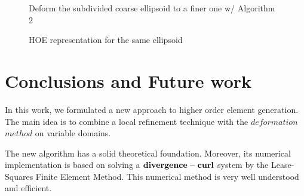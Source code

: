\documentclass{article}
\theoremstyle{definition}
\theoremstyle{remark}
\numberwithin{equation}{section}
\numberwithin{subsection}{section}
\begin{document}
\begin{figure}[H]
	\caption{Deform the subdivided coarse ellipsoid to a finer one w/ Algorithm 2}
	\begin{center}
	\end{center}
\end{figure}

\begin{figure}[H]
	\caption{HOE representation for the same ellipsoid}
	\begin{center}
	\end{center}
\end{figure}

\section{Conclusions and Future work}

In this work, we formulated a new approach to higher order element generation. The main idea is to combine a local refinement technique with the $deformation$ $method$ on variable domains.

The new algorithm has a solid theoretical foundation. Moreover, its numerical implementation is based on solving a $\bf{divergence-curl}$ system by the Lease-Squares Finite Element Method. This numerical method is very well understood and efficient. 
\end{document}
